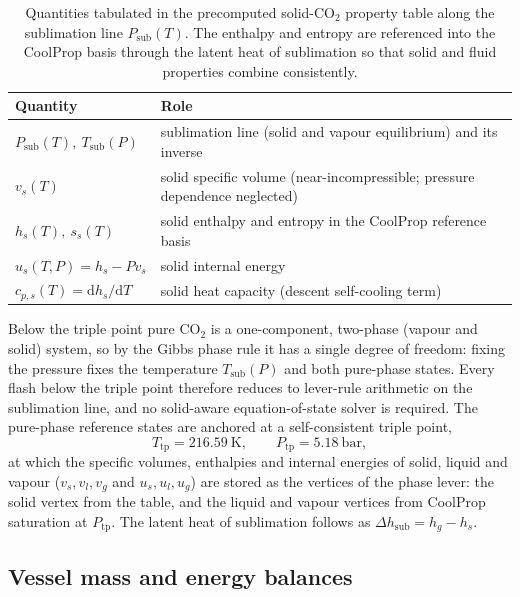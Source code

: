 \documentclass[5p,authoryear]{elsarticle}
\begin{document}
\begin{table}[!tbh]
\centering
\caption{Quantities tabulated in the precomputed solid-CO$_2$ property table along the sublimation
line $P_\text{sub}(T)$. The enthalpy and entropy are referenced into the CoolProp basis through the
latent heat of sublimation so that solid and fluid properties combine consistently.}
\label{tab:solidtable}
\footnotesize
\begin{tabularx}{\columnwidth}{@{}l X@{}}
\toprule
Quantity & Role \\
\midrule
$P_\text{sub}(T),\ T_\text{sub}(P)$ & sublimation line (solid and vapour equilibrium) and its inverse \\
$v_s(T)$ & solid specific volume (near-incompressible; pressure dependence neglected) \\
$h_s(T),\ s_s(T)$ & solid enthalpy and entropy in the CoolProp reference basis \\
$u_s(T,P) = h_s - P v_s$ & solid internal energy \\
$c_{p,s}(T) = \mathrm{d}h_s/\mathrm{d}T$ & solid heat capacity (descent self-cooling term) \\
\bottomrule
\end{tabularx}
\end{table}

Below the triple point pure CO$_2$ is a one-component, two-phase (vapour and solid) system, so by
the Gibbs phase rule it has a single degree of freedom: fixing the pressure fixes the temperature
$T_\text{sub}(P)$ and both pure-phase states. Every flash below the triple point therefore reduces
to lever-rule arithmetic on the sublimation line, and no solid-aware equation-of-state solver is
required. The pure-phase reference states are anchored at a self-consistent triple point,
\begin{equation}
\label{eq:triple}
T_\text{tp} = 216.59~\text{K}, \qquad P_\text{tp} = 5.18~\text{bar},
\end{equation}
at which the specific volumes, enthalpies and internal energies of solid, liquid and vapour
($v_{s},v_{l},v_{g}$ and $u_{s},u_{l},u_{g}$) are stored as the vertices of the phase lever: the
solid vertex from the table, and the liquid and vapour vertices from CoolProp saturation at
$P_\text{tp}$. The latent heat of sublimation follows as $\Delta h_\text{sub} = h_g - h_s$.

\subsection{Vessel mass and energy balances}
\label{sec:balance}
\end{document}
